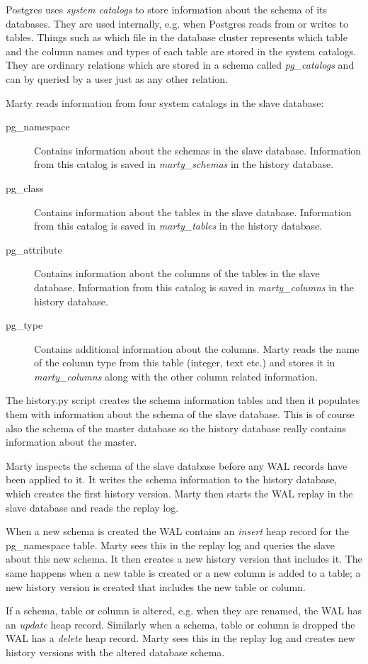 Postgres uses \textit{system catalogs} to store information about the schema of its databases.
They are used internally, e.g. when Postgres reads from or writes to tables.
Things such as which file in the database cluster represents which table and the column names and types of each table are stored in the system catalogs. %
They are ordinary relations which are stored in a schema called \textit{pg\_catalogs} and can by queried by a user just as any other relation.

Marty reads information from four system catalogs in the slave database:

\begin{description}
  \item[pg\_namespace]
    Contains information about the schemas in the slave database.
    Information from this catalog is saved in \textit{marty\_schemas} in the history database. %
  \item[pg\_class]
    Contains information about the tables in the slave database.
    Information from this catalog is saved in \textit{marty\_tables} in the history database.
  \item[pg\_attribute]
    Contains information about the columns of the tables in the slave database.
    Information from this catalog is saved in \textit{marty\_columns} in the history database.
  \item[pg\_type]
    Contains additional information about the columns.
    Marty reads the name of the column type from this table (integer, text etc.) and stores it in \textit{marty\_columns} along with the other column related information.
\end{description}

The history.py script creates the schema information tables and then it populates them with information about the schema of the slave database.
This is of course also the schema of the master database so the history database really contains information about the master.

Marty inspects the schema of the slave database before any WAL records have been applied to it.
It writes the schema information to the history database, which creates the first history version.
Marty then starts the WAL replay in the slave database and reads the replay log.

When a new schema is created the WAL contains an \textit{insert} heap record for the pg\_namespace table.
Marty sees this in the replay log and queries the slave about this new schema.
It then creates a new history version that includes it.
The same happens when a new table is created or a new column is added to a table; a new history version is created that includes the new table or column.

If a schema, table or column is altered, e.g. when they are renamed, the WAL has an \textit{update} heap record.
Similarly when a schema, table or column is dropped the WAL has a \textit{delete} heap record.
Marty sees this in the replay log and creates new history versions with the altered database schema.